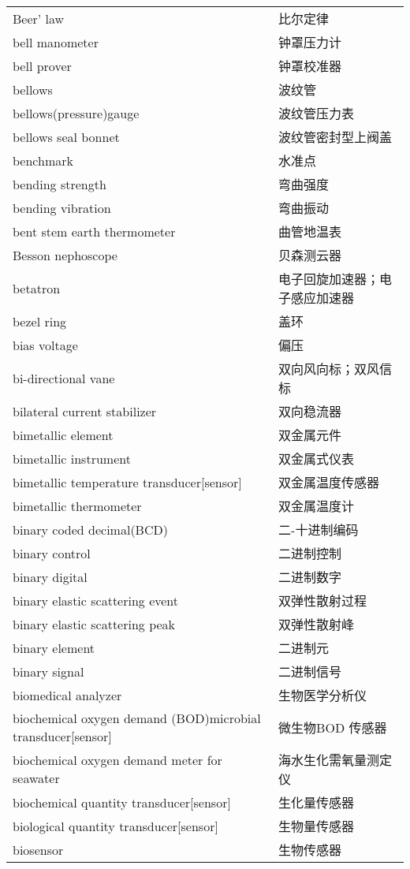 \documentclass[
]{article}
\begin{document}
\begin{longtable}[]{@{}ll@{}}
Beer' law & 比尔定律 \\
bell manometer & 钟罩压力计 \\
bell prover & 钟罩校准器 \\
bellows & 波纹管 \\
bellows(pressure)gauge & 波纹管压力表 \\
bellows seal bonnet & 波纹管密封型上阀盖 \\
benchmark & 水准点 \\
bending strength & 弯曲强度 \\
bending vibration & 弯曲振动 \\
bent stem earth thermometer & 曲管地温表 \\
Besson nephoscope & 贝森测云器 \\
betatron & 电子回旋加速器；电子感应加速器 \\
bezel ring & 盖环 \\
bias voltage & 偏压 \\
bi-directional vane & 双向风向标；双风信标 \\
bilateral current stabilizer & 双向稳流器 \\
bimetallic element & 双金属元件 \\
bimetallic instrument & 双金属式仪表 \\
bimetallic temperature transducer{[}sensor{]} & 双金属温度传感器\\
bimetallic thermometer & 双金属温度计 \\
binary coded decimal(BCD) & 二-十进制编码 \\
binary control & 二进制控制 \\
binary digital & 二进制数字 \\
binary elastic scattering event & 双弹性散射过程 \\
binary elastic scattering peak & 双弹性散射峰 \\
binary element & 二进制元 \\
binary signal & 二进制信号 \\
biomedical analyzer & 生物医学分析仪 \\
biochemical oxygen demand (BOD)microbial transducer{[}sensor{]} &
微生物BOD 传感器 \\
biochemical oxygen demand meter for seawater & 海水生化需氧量测定仪 \\
biochemical quantity transducer{[}sensor{]} & 生化量传感器 \\
biological quantity transducer{[}sensor{]} & 生物量传感器 \\
biosensor & 生物传感器 \\

\end{longtable}
\end{document}
